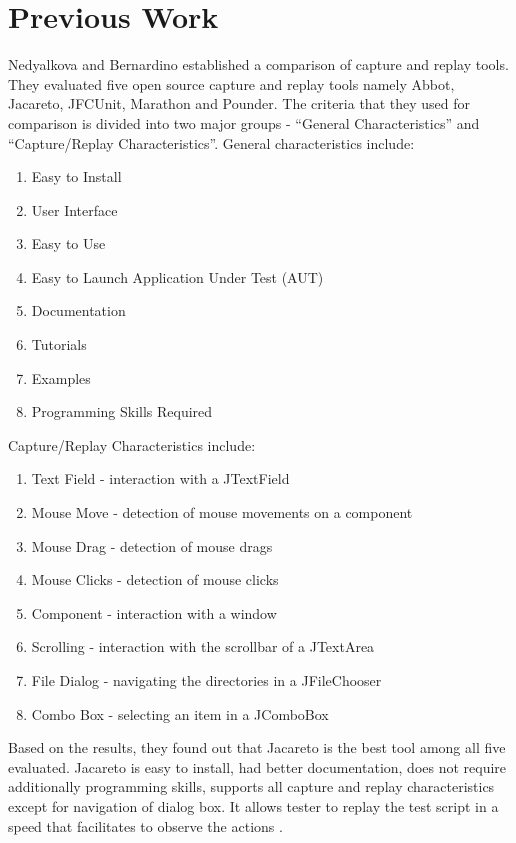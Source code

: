 \documentclass[10pt,journal]{IEEEtran}
\begin{document}
\section{Previous Work}
Nedyalkova and  Bernardino established a comparison of capture and replay tools. They evaluated five open source capture and replay tools namely Abbot, Jacareto, JFCUnit, Marathon and Pounder. The criteria that they used for comparison is divided into two major groups - ``General Characteristics'' and ``Capture/Replay Characteristics''. General characteristics include:
\begin{enumerate}
\item Easy to Install
\item User Interface
\item Easy to Use
\item Easy to Launch Application Under Test (AUT)
\item Documentation
\item Tutorials
\item Examples
\item Programming Skills Required
\end{enumerate}
Capture/Replay Characteristics include:
\begin{enumerate}
\item Text Field - interaction with a JTextField
\item Mouse Move - detection of mouse movements on a component
\item Mouse Drag - detection of mouse drags
\item Mouse Clicks - detection of mouse clicks
\item Component - interaction with a window
\item Scrolling - interaction with the scrollbar of a JTextArea
\item File Dialog - navigating the directories in a JFileChooser
\item Combo Box - selecting an item in a JComboBox
\end{enumerate}
Based on the results, they found out that Jacareto is the best tool among all five evaluated. Jacareto is easy to install, had better documentation, does not require additionally programming skills, supports all capture and replay characteristics except for navigation of dialog box. It allows tester to replay the test script in a speed that facilitates to observe the actions \cite{Nedyalkova:2013:OSC:2494444.2494464}.
\end{document}
